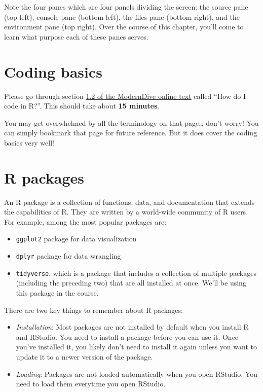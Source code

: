 \documentclass[
]{book}
\providecommand{\tightlist}{%
  \setlength{\itemsep}{0pt}\setlength{\parskip}{0pt}}
\begin{document}
Note the four panes which are four panels dividing the screen: the source pane (top left), console pane (bottom left), the files pane (bottom right), and the environment pane (top right). Over the course of this chapter, you'll come to learn what purpose each of these panes serves.

\section{Coding basics}\label{coding_basics}

Please go through section \href{https://moderndive.com/1-getting-started.html\#code}{1.2 of the ModernDive online text} called ``How do I code in R?''. This should take about \textbf{15 minutes}.

You may get overwhelmed by all the terminology on that page\ldots{} don't worry! You can simply bookmark that page for future reference. But it does cover the coding basics very well!

\section{R packages}\label{packages}

An R package is a collection of functions, data, and documentation that extends the capabilities of R. They are written by a world-wide community of R users. For example, among the most popular packages are:

\begin{itemize}
\tightlist
\item
  \texttt{ggplot2} package for data visualization
\item
  \texttt{dplyr} package for data wrangling
\item
  \texttt{tidyverse}, which is a package that includes a collection of multiple packages (including the preceding two) that are all installed at once. We'll be using this package in the course.
\end{itemize}

There are two key things to remember about R packages:

\begin{itemize}
\item
  \emph{Installation}: Most packages are not installed by default when you install R and RStudio. You need to install a package before you can use it. Once you've installed it, you likely don't need to install it again unless you want to update it to a newer version of the package.
\item
  \emph{Loading}: Packages are not loaded automatically when you open RStudio. You need to load them everytime you open RStudio.
\end{itemize}
\end{document}
